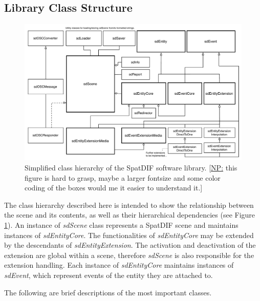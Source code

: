 \documentclass{article}
\newcommand{\np}[1]{\noindent\textcolor{carrotorange}{[\underline{NP:} #1]}}
\begin{document}
\subsection{Library Class Structure}\label{subsec:class_structure}

\begin{figure}[bh]
	\centering
	\includegraphics[width=0.95\columnwidth]{class_diagram.pdf}
	\caption{Simplified class hierarchy of the SpatDIF software library. \np{this figure is hard to grasp, maybe a larger fontsize and some color coding of the boxes would me it easier to understand it.}
	\label{fig:class_structure}
}
\end{figure}


The class hierarchy described here is intended to show the relationship between the scene and its contents, as well as their hierarchical dependencies (see Figure \ref{fig:class_structure}). 
An instance of \emph{sdScene} class represents a SpatDIF scene and maintains instances of \emph{sdEntityCore}. The functionalities of \emph{sdEntityCore} may be extended by the descendants of \emph{sdEntityExtension}. 
The activation and deactivation of the extension are global within a scene, therefore \emph{sdScene} is also responsible for the extension handling.
Each instance of \emph{sdEntityCore} maintains instances of \emph{sdEvent}, which represent events of the entity they are attached to.

The following are brief descriptions of the most important classes.
\end{document}
